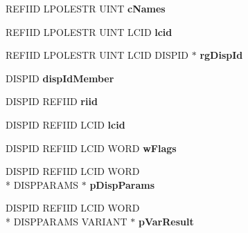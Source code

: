 \begin{DoxyCompactItemize}
\item 
\hypertarget{struct_i_badge_icon_failed_vtbl_aab8419418ecfd87346929c3d06fd2edf}{R\-E\-F\-I\-I\-D L\-P\-O\-L\-E\-S\-T\-R U\-I\-N\-T {\bfseries c\-Names}}\label{struct_i_badge_icon_failed_vtbl_aab8419418ecfd87346929c3d06fd2edf}

\item 
\hypertarget{struct_i_badge_icon_failed_vtbl_a7a4c906fad1c5467e8f14dd38374c500}{R\-E\-F\-I\-I\-D L\-P\-O\-L\-E\-S\-T\-R U\-I\-N\-T L\-C\-I\-D {\bfseries lcid}}\label{struct_i_badge_icon_failed_vtbl_a7a4c906fad1c5467e8f14dd38374c500}

\item 
\hypertarget{struct_i_badge_icon_failed_vtbl_a66cfd560c6499bbc64fe78d07b329076}{R\-E\-F\-I\-I\-D L\-P\-O\-L\-E\-S\-T\-R U\-I\-N\-T L\-C\-I\-D D\-I\-S\-P\-I\-D $\ast$ {\bfseries rg\-Disp\-Id}}\label{struct_i_badge_icon_failed_vtbl_a66cfd560c6499bbc64fe78d07b329076}

\item 
\hypertarget{struct_i_badge_icon_failed_vtbl_ab645665f8477975239c46b5420365959}{D\-I\-S\-P\-I\-D {\bfseries disp\-Id\-Member}}\label{struct_i_badge_icon_failed_vtbl_ab645665f8477975239c46b5420365959}

\item 
\hypertarget{struct_i_badge_icon_failed_vtbl_a8a6a41ce4714213d1075adb690a8bfa4}{D\-I\-S\-P\-I\-D R\-E\-F\-I\-I\-D {\bfseries riid}}\label{struct_i_badge_icon_failed_vtbl_a8a6a41ce4714213d1075adb690a8bfa4}

\item 
\hypertarget{struct_i_badge_icon_failed_vtbl_a7091ebb12ca0dae4e696178a7fbfc12e}{D\-I\-S\-P\-I\-D R\-E\-F\-I\-I\-D L\-C\-I\-D {\bfseries lcid}}\label{struct_i_badge_icon_failed_vtbl_a7091ebb12ca0dae4e696178a7fbfc12e}

\item 
\hypertarget{struct_i_badge_icon_failed_vtbl_a6aa7c33a71ace684ed006c85d0a6c139}{D\-I\-S\-P\-I\-D R\-E\-F\-I\-I\-D L\-C\-I\-D W\-O\-R\-D {\bfseries w\-Flags}}\label{struct_i_badge_icon_failed_vtbl_a6aa7c33a71ace684ed006c85d0a6c139}

\item 
\hypertarget{struct_i_badge_icon_failed_vtbl_a09136fa25d1930ae6dce0df767428088}{D\-I\-S\-P\-I\-D R\-E\-F\-I\-I\-D L\-C\-I\-D W\-O\-R\-D \\*
D\-I\-S\-P\-P\-A\-R\-A\-M\-S $\ast$ {\bfseries p\-Disp\-Params}}\label{struct_i_badge_icon_failed_vtbl_a09136fa25d1930ae6dce0df767428088}

\item 
\hypertarget{struct_i_badge_icon_failed_vtbl_a2cd65eb850bd9f6d2bdc6a7cb5c0f8bf}{D\-I\-S\-P\-I\-D R\-E\-F\-I\-I\-D L\-C\-I\-D W\-O\-R\-D \\*
D\-I\-S\-P\-P\-A\-R\-A\-M\-S V\-A\-R\-I\-A\-N\-T $\ast$ {\bfseries p\-Var\-Result}}\label{struct_i_badge_icon_failed_vtbl_a2cd65eb850bd9f6d2bdc6a7cb5c0f8bf}


\end{DoxyCompactItemize}
